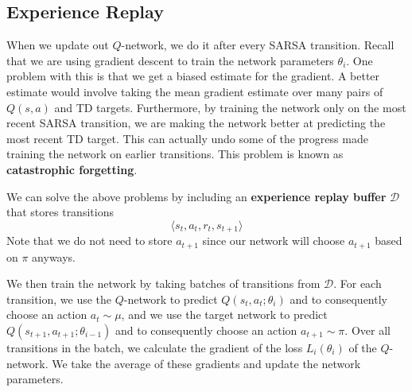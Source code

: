 \documentclass[journal, onecolumn, 12pt, draftclsnofoot]{IEEEtran}
\numberwithin{equation}{section}
\newcommand{\kword}[1]{\textbf{#1}}
\newcommand{\mc}[1]{\mathcal{#1}}
\begin{document}
		\subsection{Experience Replay}
		\par When we update out $Q$-network, we do it after every SARSA transition. Recall that we are using gradient descent to train the network parameters $\theta_i$. One problem with this is that we get a biased estimate for the gradient. A better estimate would involve taking the mean gradient estimate over many pairs of $Q(s,a)$ and TD targets. Furthermore, by training the network only on the most recent SARSA transition, we are making the network better at predicting the most recent TD target. This can actually undo some of the progress made training the network on earlier transitions. This problem is known as \kword{catastrophic forgetting}.
		\par We can solve the above problems by including an \kword{experience replay buffer} $\mc{D}$ that stores transitions
		$$\langle s_t, a_t, r_t, s_{t+1} \rangle$$
		Note that we do not need to store $a_{t+1}$ since our network will choose $a_{t+1}$ based on $\pi$ anyways.
		\par We then train the network by taking batches of transitions from $\mc{D}$. For each transition, we use the $Q$-network to predict $Q(s_t,a_t;\theta_i)$ and to consequently choose an action $a_t \sim \mu$, and we use the target network to predict $Q(s_{t+1},a_{t+1}; \theta_{i-1})$ and to consequently choose an action $a_{t+1} \sim \pi$. Over all transitions in the batch, we calculate the gradient of the loss $L_i(\theta_i)$ of the $Q$-network. We take the average of these gradients and update the network parameters.
\end{document}
